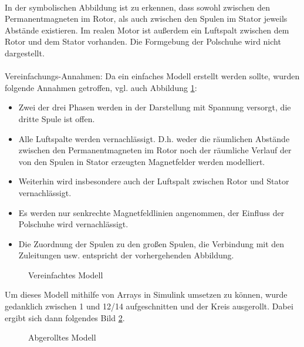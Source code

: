 \paragraph{}
In der symbolischen Abbildung ist zu erkennen, dass sowohl zwischen den Permanentmagneten im Rotor, als auch zwischen den Spulen im Stator jeweils Abstände existieren. 
Im realen Motor ist außerdem ein Luftspalt zwischen dem Rotor und dem Stator vorhanden. 
Die Formgebung der Polschuhe wird nicht dargestellt.

\paragraph{}
Vereinfachungs-Annahmen: 
Da ein einfaches Modell erstellt werden sollte, wurden folgende Annahmen getroffen, vgl. auch Abbildung \ref{FigVereinfachtesModell}:
\begin{itemize}
	\item Zwei der drei Phasen werden in der Darstellung mit Spannung versorgt, die dritte Spule ist offen.
	\item Alle Luftspalte werden vernachlässigt. D.h. weder die räumlichen Abstände zwischen den Permanentmagneten im Rotor noch der räumliche Verlauf der von den Spulen in Stator erzeugten Magnetfelder werden modelliert. 
	\item Weiterhin wird insbesondere auch der Luftspalt zwischen Rotor und Stator vernachlässigt.
	\item Es werden nur senkrechte Magnetfeldlinien angenommen, der Einfluss der Polschuhe wird vernachlässigt.
	\item Die Zuordnung der Spulen zu den großen Spulen, die Verbindung mit den Zuleitungen usw. entspricht der vorhergehenden Abbildung. 
\end{itemize}

\begin{figure}[htbp]
	\begin{center}
		
		\caption{Vereinfachtes Modell}
		\label{FigVereinfachtesModell}
	\end{center}
	
\end{figure}


Um dieses Modell mithilfe von Arrays in Simulink umsetzen zu können, wurde gedanklich zwischen 1 und 12/14 aufgeschnitten und der Kreis ausgerollt. Dabei ergibt sich dann folgendes Bild \ref{FigAbgerolltesModell}.


\begin{figure}[htbp]
	\begin{center}
		
		\caption{Abgerolltes Modell}
		\label{FigAbgerolltesModell}
	\end{center}
	
\end{figure}


